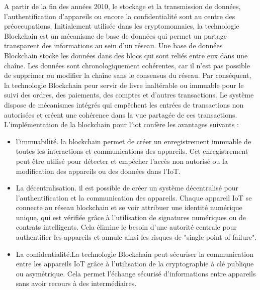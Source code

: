 A partir de la fin des années 2010, le stockage et la transmission de données, l'authentification d'appareils ou encore la confidentialité sont au centre des préoc\-cupations. Initialement utilisée dans les cryptomonnaies, la technologie Blockchain est un mécanisme de base de données qui permet un partage transparent des informations au sein d'un réseau. Une base de données Blockchain stocke les données dans des blocs qui sont reliés entre eux dans une chaîne. Les données sont chronologiquement cohérentes, car il n'est pas possible de supprimer ou modifier la chaîne sans le consensus du réseau. Par conséquent, la technologie Blockchain peur servir de livre inaltérable ou immuable pour le suivi des ordres, des paiements, des comptes et d'autres transactions. Le système dispose de mécanismes intégrés qui empêchent les entrées de transactions non autorisées et créent une cohérence dans la vue partagée de ces transactions. L'implémentation de la blockchain pour l'iot confère les avantages suivants\cite{block} : 
\begin{itemize}
\item l'immuabilité. la blockchain permet de créer un enregistrement immuable de toutes les interactions et communications des appareils. Cet enregistrement peut être utilisé pour détecter et empêcher l'accès non autorisé ou la modification des appareils ou des données dans l'\ac{IoT}.
\item La décentralisation. il est possible de créer un système décentralisé pour l’authentification et la communication des appareils. Chaque appareil \ac{IoT} se connecte au réseau blockchain et se voir attribuer une identité numérique unique, qui est vérifiée grâce à l'utilisation de signatures numériques ou de contrats intelligents. Cela élimine le besoin d’une autorité centrale pour authentifier les appareils et annule ainsi les risques de "single point of failure".
\item La confidentialité.La technologie Blockchain peut sécuriser la communication entre les appareils IoT grâce à l'utilisation de la cryptographie à clé publique ou asymétrique. Cela permet l’échange sécurisé d’informations entre appareils sans avoir recours à des intermédiaires.
\end{itemize}

\vspace{0.1cm}

